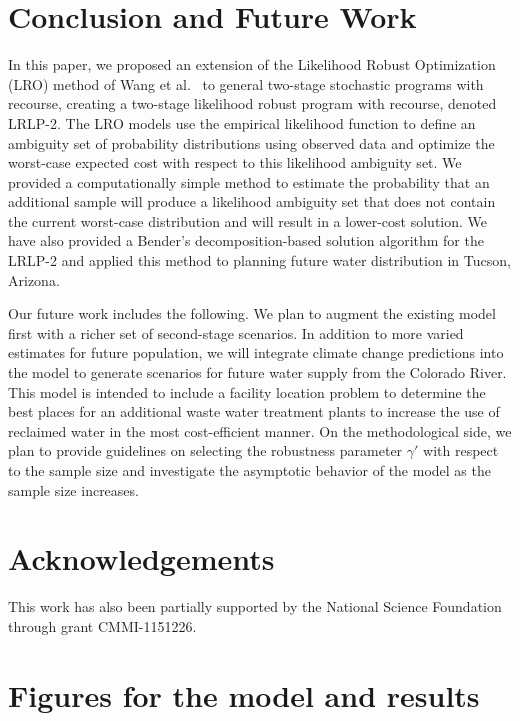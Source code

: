 \documentclass[12pt]{amsart}
\begin{document}
\section{Conclusion and Future Work}
\label{sec:concl}

In this paper, we proposed an extension of the Likelihood Robust Optimization (LRO) method of Wang et al.\ \cite{wang2010likelihood} to general two-stage stochastic programs with recourse, creating a two-stage likelihood robust program with recourse, denoted LRLP-2.
The LRO models use the empirical likelihood function to define an ambiguity set of probability distributions using observed data and optimize the worst-case expected cost with respect to this likelihood ambiguity set.
We provided a computationally simple method to estimate the probability that an additional sample will produce a likelihood ambiguity set that does not contain the current worst-case distribution and will result in a lower-cost solution. 
We have also provided a Bender's decomposition-based solution algorithm for the LRLP-2 and applied this method to planning future water distribution in Tucson, Arizona.

Our future work includes the following. We plan to augment the existing model first with a richer set of second-stage scenarios.
In addition to more varied estimates for future population, we will integrate climate change predictions into the model to generate scenarios for future water supply from the Colorado River. 
This model is intended to include a facility location problem to determine the best places for an additional waste water treatment plants to increase the use of reclaimed water in the most cost-efficient manner. On the methodological side, we plan to provide guidelines on selecting the robustness parameter $\gamma'$ with respect to the sample size and investigate the asymptotic behavior of the model as the sample size increases. 

\section*{Acknowledgements}
This work has also been partially supported by the National Science Foundation through grant CMMI-1151226.




\pagebreak

\appendix

\section{Figures for the model and results}
\label{app:figures}
\end{document}
